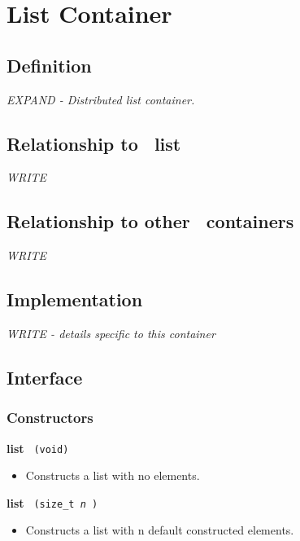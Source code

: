 
\section{ List Container} \label{sec-list-cont}

\subsection{Definition}

\textit{EXPAND - Distributed list container.}

\subsection{Relationship to \stl\ list}

\textit{WRITE}

\subsection{Relationship to other \stapl\ containers}

\textit{WRITE}

\subsection{Implementation}

\textit{WRITE - details specific to this container}

\subsection{Interface} \label{sec-list-cont-inter}

\subsubsection{Constructors}

\noindent
\textbf{list}%
\texttt{%
(void)
}
 
\begin{itemize}
\item
Constructs a list with no elements.
\end{itemize}
 
\noindent
\textbf{list}%
\texttt{%
(size\_t
\textit{n}%
)
}

\begin{itemize}
\item
Constructs a list with n default constructed elements.
\end{itemize}
 
